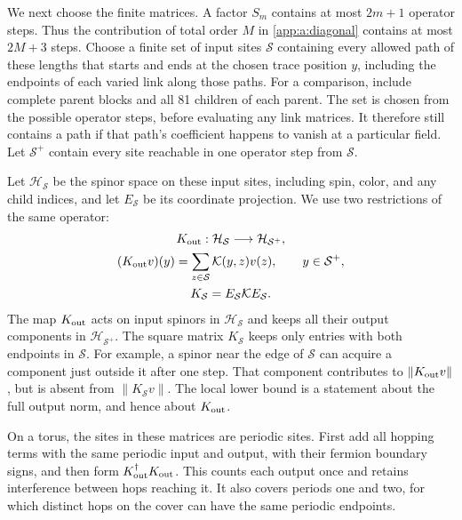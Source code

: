 \documentclass[11pt,a4paper]{article}
\theoremstyle{remark}
\begin{document}
We next choose the finite matrices. A factor $S_m$ contains at most
$2m+1$ operator steps. Thus the contribution of total order $M$ in
\eqref{app:a:diagonal} contains at most $2M+3$ steps. Choose a finite
set of input sites $\mathcal S$ containing every allowed path of
these lengths that starts and ends at the chosen trace position $y$,
including the endpoints of each varied link along those paths. For a comparison,
include complete parent blocks and all 81 children of each parent.
The set is chosen from the possible operator steps, before evaluating
any link matrices. It therefore still contains a path if that path's
coefficient happens to vanish at a particular field. Let
$\mathcal S^+$ contain every site reachable in one operator step from
$\mathcal S$.

Let $\mathcal H_{\mathcal S}$ be the spinor space on these input
sites, including spin, color, and any child indices, and let
$E_{\mathcal S}$ be its coordinate projection. We use two restrictions
of the same operator:
\begin{equation}
 \begin{gathered}
 K_{\rm out}:\mathcal H_{\mathcal S}
                 \longrightarrow\mathcal H_{\mathcal S^+},\\
 (K_{\rm out}v)(y)
     =\sum_{z\in\mathcal S}\mathcal K(y,z)v(z),
             \qquad y\in\mathcal S^+,\\
 K_{\mathcal S}=E_{\mathcal S}\mathcal K E_{\mathcal S}.
 \end{gathered}
\end{equation}
The map $K_{\rm out}$ acts on input spinors in
$\mathcal H_{\mathcal S}$ and keeps all their output components in
$\mathcal H_{\mathcal S^+}$. The square matrix $K_{\mathcal S}$
keeps only entries with both endpoints in $\mathcal S$. For example,
a spinor near the edge of $\mathcal S$ can acquire a component just
outside it after one step. That component contributes to
$\|K_{\rm out}v\|$, but is absent from
$\|K_{\mathcal S}v\|$. The local lower bound is a statement about
the full output norm, and hence about $K_{\rm out}$.

On a torus, the sites in these matrices are periodic sites. First add
all hopping terms with the same periodic input and output, with their
fermion boundary signs, and then form
$K_{\rm out}^\dagger K_{\rm out}$. This counts each output once
and retains interference between hops reaching it. It also covers
periods one and two, for which distinct hops on the cover can have
the same periodic endpoints.
\end{document}
